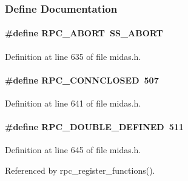 \subsubsection{Define Documentation}
\paragraph[{RPC\_\-ABORT}]{\setlength{\rightskip}{0pt plus 5cm}\#define RPC\_\-ABORT~SS\_\-ABORT}\hfill\label{group__err25_ga2a163d317723a6d3ac14627503f6ca7a}

\begin{DoxyItemize}
\item 
\end{DoxyItemize}

Definition at line 635 of file midas.h.
\paragraph[{RPC\_\-CONNCLOSED}]{\setlength{\rightskip}{0pt plus 5cm}\#define RPC\_\-CONNCLOSED~507}\hfill\label{group__err25_ga50c5b6ef0ae99ed578f9209fdd961ac1}

\begin{DoxyItemize}
\item 
\end{DoxyItemize}

Definition at line 641 of file midas.h.
\paragraph[{RPC\_\-DOUBLE\_\-DEFINED}]{\setlength{\rightskip}{0pt plus 5cm}\#define RPC\_\-DOUBLE\_\-DEFINED~511}\hfill\label{group__err25_ga68d214e584f6bcd6e91f25f1b9d79f54}

\begin{DoxyItemize}
\item 
\end{DoxyItemize}

Definition at line 645 of file midas.h.

Referenced by rpc\_\-register\_\-functions().

